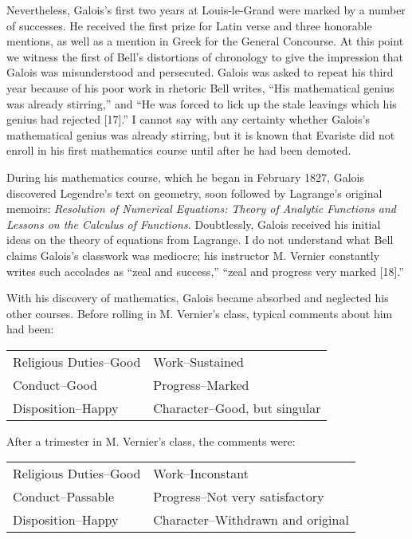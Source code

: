 \documentclass[12pt]{article}
\begin{document}
Nevertheless, Galois's first two years at Louis-le-Grand were marked by a number of successes. He received the first prize for Latin verse and three honorable mentions, as well as a mention in Greek for the General Concourse. At this point we witness the first of Bell's distortions of chronology to give the impression that Galois was misunderstood and persecuted. Galois was asked to repeat his third year because of his poor work in rhetoric Bell writes, ``His mathematical genius was already stirring,'' and ``He was forced to lick up the stale leavings which his genius had rejected [17].'' I cannot say with any certainty whether Galois's mathematical genius was already stirring, but it is known that Evariste did not enroll in his first mathematics course until after he had been demoted.

During his mathematics course, which he began in February 1827, Galois discovered Legendre's text on geometry, soon followed by Lagrange's original memoirs: \emph{Resolution of Numerical Equations: Theory of Analytic Functions and Lessons on the Calculus of Functions.} Doubtlessly, Galois received his initial ideas on the theory of equations from Lagrange. I do not understand what Bell claims Galois's classwork was mediocre; his instructor M. Vernier constantly writes such accolades as ``zeal and success,'' ``zeal and progress very marked [18].''

With his discovery of mathematics, Galois became absorbed and neglected his other courses. Before rolling in M. Vernier's class, typical comments about him had been:

\medskip
\begin{tabular}{ll}
Religious Duties--Good &Work--Sustained\\
Conduct--Good & Progress--Marked\\
Disposition--Happy & Character--Good, but singular
\end{tabular}
\medskip

\noindent
After a trimester in M. Vernier's class, the comments were:

\medskip
\begin{tabular}{ll}
Religious Duties--Good & Work--Inconstant \\
Conduct--Passable & Progress--Not very satisfactory \\
Disposition--Happy & Character--Withdrawn and original\\
\end{tabular}
\medskip
\end{document}
